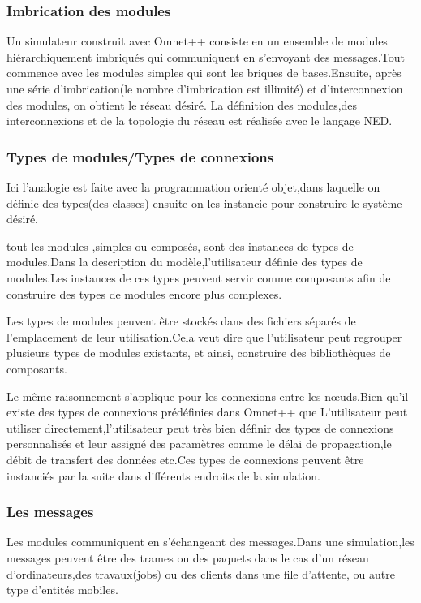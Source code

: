 \subsubsection{Imbrication des modules}
Un simulateur construit avec Omnet++ consiste en un ensemble de modules hiérarchiquement imbriqués qui communiquent en s'envoyant des messages.Tout commence avec les modules simples qui sont les briques de bases.Ensuite, après une série  d'imbrication(le nombre d'imbrication est illimité) et d'interconnexion des modules, on obtient le réseau désiré.
La définition des modules,des interconnexions et de la topologie du réseau est réalisée avec le langage NED.

\subsubsection{Types de modules/Types de connexions }
Ici l'analogie est faite avec la programmation orienté objet,dans laquelle on définie des types(des classes) ensuite on les instancie pour construire le système désiré.

tout les modules ,simples ou composés, sont des instances de types de modules.Dans la description du modèle,l'utilisateur définie des types de modules.Les instances de ces types peuvent servir comme composants afin de construire des types de modules encore plus complexes.

Les types de modules peuvent être stockés dans des fichiers séparés de l'emplacement de leur utilisation.Cela veut dire que l'utilisateur peut regrouper plusieurs types de modules existants, et ainsi, construire des bibliothèques de composants.

Le même raisonnement s'applique pour les connexions entre les nœuds.Bien qu'il existe des types de connexions prédéfinies dans Omnet++ que L'utilisateur peut utiliser directement,l'utilisateur peut très bien définir des types de connexions  personnalisés et leur assigné des paramètres comme le délai de propagation,le débit de transfert des données etc.Ces types de connexions peuvent être instanciés par la suite dans différents endroits de la simulation. 
\subsubsection{Les messages}
Les modules communiquent en s'échangeant des messages.Dans une simulation,les messages peuvent être des trames ou des paquets dans le cas d'un réseau d'ordinateurs,des travaux(jobs) ou des clients dans une file d'attente, ou autre type d'entités mobiles.

